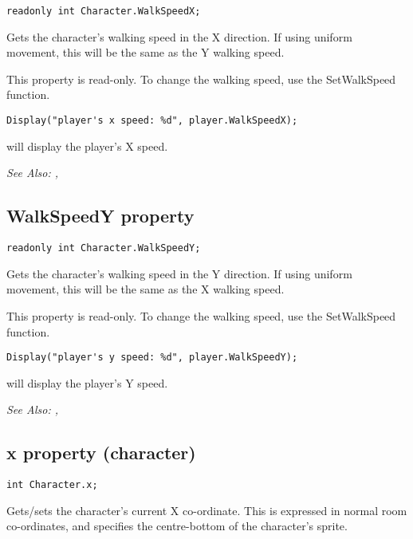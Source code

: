 \begin{verbatim}
readonly int Character.WalkSpeedX;
\end{verbatim}

Gets the character's walking speed in the X direction. If using uniform movement,
this will be the same as the Y walking speed.

This property is read-only. To change the walking speed, use the SetWalkSpeed function.

\begin{verbatim}
Display("player's x speed: %d", player.WalkSpeedX);
\end{verbatim}
will display the player's X speed.

\it{See Also:} ,


\subsection{WalkSpeedY property}\label{Character.WalkSpeedY}%

\begin{verbatim}
readonly int Character.WalkSpeedY;
\end{verbatim}

Gets the character's walking speed in the Y direction. If using uniform movement,
this will be the same as the X walking speed.

This property is read-only. To change the walking speed, use the SetWalkSpeed function.

\begin{verbatim}
Display("player's y speed: %d", player.WalkSpeedY);
\end{verbatim}
will display the player's Y speed.

\it{See Also:} ,


\subsection{x property (character)}\label{Character.x}%

\begin{verbatim}
int Character.x;
\end{verbatim}

Gets/sets the character's current X co-ordinate. This is expressed in normal room
co-ordinates, and specifies the centre-bottom of the character's sprite.

